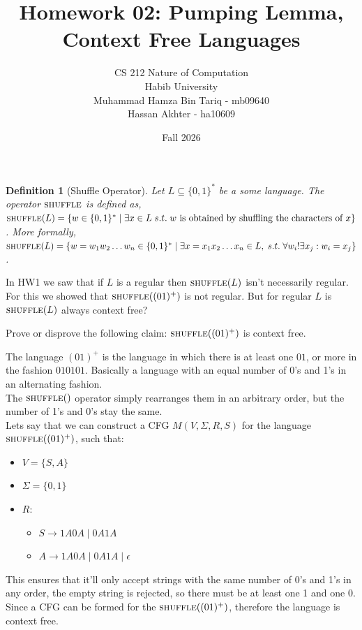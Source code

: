 \documentclass[a4paper]{exam}
\title{Homework 02: Pumping Lemma, Context Free Languages}
\author{CS 212 Nature of Computation\\Habib University\\
Muhammad Hamza Bin Tariq - mb09640\\%
Hassan Akhter - ha10609 %
}
\date{Fall 2026}
\newcommand{\shuffle}{\textsc{shuffle}} %
\newtheorem{definition}{Definition}
\begin{document}
\maketitle


\begin{questions}

	\question[10]
	\begin{definition}[Shuffle Operator]
		Let $L \subseteq \{0,1\}^*$ be a some language. The operator $\shuffle$ is defined as, $\shuffle(L) = \{w\in \{0,1\}^*\mid \exists x \in L \;s.t. \; w \text{ is obtained by shuffling the characters of } x\}$. More formally, $\shuffle(L) = \{w = w_1w_2\dots w_n\in \{0,1\}^*\mid \exists x = x_1x_2 \dots x_n \in L, \;s.t.\; \forall w_i !\exists x_j : w_i = x_j\}$.
	\end{definition}

	In HW1 we saw that if $L$ is a regular then $\shuffle(L)$ isn't necessarily regular. For this we showed that $\shuffle((01)^+)$ is not regular. But for regular $L$ is $\shuffle(L)$ always context free?

	Prove or disprove the following claim: $\shuffle((01)^+)$ is context free.

	\begin{solution}
		The language $(01)^+$ is the language in which there is at least one $01$, or more in the fashion $010101$. Basically a language with an equal number of 0's and 1's in an alternating fashion.\\
		The $\shuffle()$ operator simply rearranges them in an arbitrary order, but the number of 1's and 0's stay the same.\\
		Lets say that we can construct a CFG $M(V,\Sigma, R, S)$ for the language $\shuffle((01)^+)$, such that:
		\begin{itemize}
			\item $V = \{S,A\}$
			\item $\Sigma = \{0,1\}$
			\item $R:$
			      \begin{itemize}
				      \item $S \rightarrow 1A0A \mid 0A1A$
				      \item $A \rightarrow 1A0A \mid 0A1A \mid \epsilon$
			      \end{itemize}
		\end{itemize}
		This ensures that it'll only accept strings with the same number of 0's and 1's in any order, the empty string is rejected, so there must be at least one 1 and one 0.\\
		Since a CFG can be formed for the $\shuffle((01)^+)$, therefore the language is context free.
	\end{solution}





\end{questions}
\end{document}
